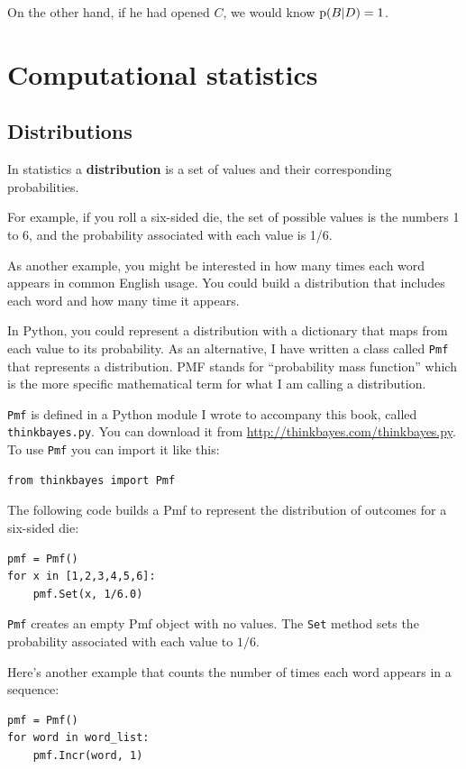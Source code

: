 \documentclass[12pt]{book}
\begin{document}
On the other hand, if he had opened $C$, we would know $\mathrm{p}(B|D) = 1$.


\chapter{Computational statistics}

\section{Distributions}

In statistics a {\bf distribution} is a set of values and their
corresponding probabilities.

For example, if you roll a six-sided die, the set of possible
values is the numbers 1 to 6, and the probability associated
with each value is 1/6.

As another example, you might be interested in how many times each
word appears in common English usage.  You could build a distribution
that includes each word and how many time it appears.

In Python, you could represent a distribution with a dictionary that
maps from each value to its probability.  As an alternative, I have
written a class called {\tt Pmf} that represents a distribution.  PMF
stands for ``probability mass function'' which is the more specific
mathematical term for what I am calling a distribution.

{\tt Pmf} is defined in a Python module I wrote to accompany this
book, called {\tt thinkbayes.py}.  You can download it from
\url{http://thinkbayes.com/thinkbayes.py}.  To use {\tt Pmf} you
can import it like this:

\begin{verbatim}
from thinkbayes import Pmf
\end{verbatim}

The following code builds a Pmf to represent the distribution
of outcomes for a six-sided die:

\begin{verbatim}
pmf = Pmf()
for x in [1,2,3,4,5,6]:
    pmf.Set(x, 1/6.0)
\end{verbatim}

\verb"Pmf" creates an empty Pmf object with no values.  The
\verb"Set" method sets the probability associated with each
value to $1/6$.

Here's another example that counts the number of times each word
appears in a sequence:

\begin{verbatim}
pmf = Pmf()
for word in word_list:
    pmf.Incr(word, 1)
\end{verbatim}
\end{document}

